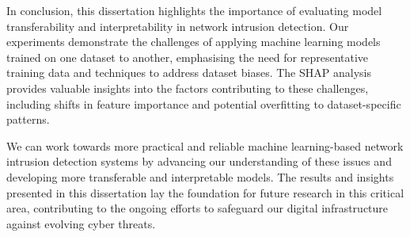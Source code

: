 In conclusion, this dissertation highlights the importance of evaluating model transferability and interpretability in network intrusion detection. Our experiments demonstrate the challenges of applying machine learning models trained on one dataset to another, emphasising the need for representative training data and techniques to address dataset biases. The SHAP analysis provides valuable insights into the factors contributing to these challenges, including shifts in feature importance and potential overfitting to dataset-specific patterns.

We can work towards more practical and reliable machine learning-based network intrusion detection systems by advancing our understanding of these issues and developing more transferable and interpretable models. The results and insights presented in this dissertation lay the foundation for future research in this critical area, contributing to the ongoing efforts to safeguard our digital infrastructure against evolving cyber threats.